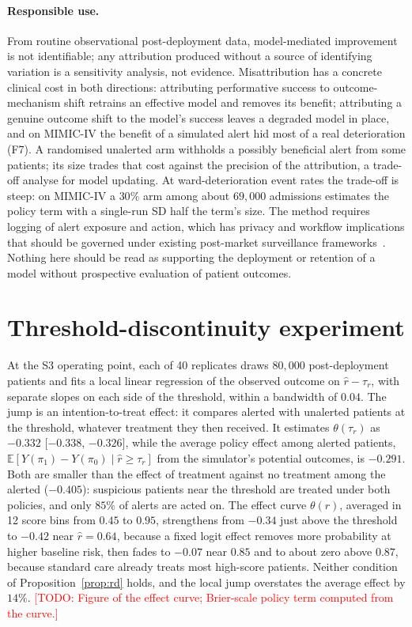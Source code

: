 \documentclass[letterpaper]{article} %
\newcommand{\todo}[1]{\textcolor{red}{[TODO: #1]}}
\newcommand{\E}{\mathbb{E}}
\newcommand{\rhat}{\hat r}
\begin{document}
\paragraph{Responsible use.} From routine observational post-deployment data,
model-mediated improvement is not identifiable; any attribution produced
without a source of identifying variation is a sensitivity analysis, not
evidence. Misattribution has a concrete clinical cost in both directions:
attributing performative success to outcome-mechanism shift retrains an
effective model and removes its benefit; attributing a genuine outcome shift to
the model's success leaves a degraded model in place, and on MIMIC-IV the
benefit of a simulated alert hid most of a real deterioration (F7). A
randomised unalerted arm withholds a possibly beneficial alert from some
patients; its size trades that cost against the precision of the attribution,
a trade-off \citet{haidarwehbe2025holdout} analyse for model updating. At
ward-deterioration event rates the trade-off is steep: on MIMIC-IV a $30\%$
arm among about $69{,}000$ admissions estimates the policy term with a
single-run SD half the term's size. The method requires
logging of alert exposure and action, which has privacy and workflow
implications that should be governed under existing post-market surveillance
frameworks~\citep{gonzalez2024regulating}. Nothing here should be read as
supporting the deployment or retention of a model without prospective
evaluation of patient outcomes.



\appendix
\section{Threshold-discontinuity experiment}
\label{app:rd}
At the S3 operating point, each of 40 replicates draws $80{,}000$
post-deployment patients and fits a local linear regression of the observed
outcome on $\rhat - \tau_r$, with separate slopes on each side of the
threshold, within a bandwidth of $0.04$. The jump is an intention-to-treat
effect: it compares alerted with unalerted patients at the threshold, whatever
treatment they then received. It estimates $\theta(\tau_r)$ as $-0.332$
[$-0.338$, $-0.326$], while the average policy effect among alerted patients,
$\E[Y(\pi_1) - Y(\pi_0) \mid \rhat \geq \tau_r]$ from the simulator's potential
outcomes, is $-0.291$. Both are smaller than the effect of treatment against no
treatment among the alerted ($-0.405$): suspicious patients near the threshold
are treated under both policies, and only $85\%$ of alerts are acted on. The
effect curve $\theta(r)$, averaged in 12 score bins from $0.45$ to $0.95$,
strengthens from $-0.34$ just above the threshold to $-0.42$ near
$\rhat = 0.64$, because a fixed logit effect removes more probability at
higher baseline risk, then fades to $-0.07$ near $0.85$ and to about zero above
$0.87$, because standard care already treats most high-score patients. Neither
condition of Proposition~\ref{prop:rd} holds, and the local jump overstates the
average effect by $14\%$. \todo{Figure of the effect curve; Brier-scale policy
term computed from the curve.}
\end{document}
